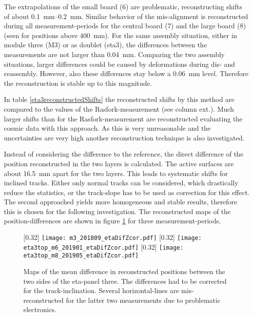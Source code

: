 \documentclass[
twoside,            %
BCOR1.4cm,          %
10pt,               %
headings=normal,    %
headsepline,        %
clearplainpage,		%
final,              %
div=14,
open=right,
bibliography=toc
]{scrreprt}
\begin{document}
The extrapolations of the small board (6) are problematic, reconstructing shifts of about \SIrange{0.1}{0.2}{mm}.
Similar behavior of the mis-alignment is reconstructed during all measurement-periods for the central board (7) and the large board (8) (seen for positions above \SI{400}{mm}).
For the same assembly situation, either in module three (M3) or as doublet (eta3), the differences between the measurements are not larger than \SI{0.04}{mm}.
Comparing the two assembly situations, larger differences could be caused by deformations during dis- and reassembly.
However, also these differences stay below a \SI{0.06}{mm} level.
Therefore the reconstruction is stable up to this magnitude.

In table \ref{eta3reconstructedShifts} the reconstructed shifts by this method are compared to the values of the Rasfork-measurement (see column ext.).
Much larger shifts than for the Rasfork-measurement are reconstructed evaluating the cosmic data with this approach.
As this is very unreasonable and the uncertainties are very high another reconstruction technique is also investigated.

Instead of considering the difference to the reference, the direct difference of the position reconstructed in the two layers is calculated.
The active surfaces are about \SI{16.5}{mm} apart for the two layers.
This leads to systematic shifts for inclined tracks.
Either only normal tracks can be considered, which drastically reduce the statistics, or the track-slope has to be used as correction for this effect.
The second approached yields more homogeneous and stable results, therefore this is chosen for the following investigation.
The reconstructed maps of the position-differences are shown in figure \ref{eta3CentroidDifference} for three measurement-periods.

\begin{figure}[!h]
	\centering
	[0.32\textwidth]
	{\texttt{[image: m3\_201809\_etaDifZcor.pdf]}}
	\hfill
	[0.32\textwidth]
	{\texttt{[image: eta3top\_m6\_201901\_etaDifZcor.pdf]}}
	\hfill
	[0.32\textwidth]
	{\texttt{[image: eta3top\_m8\_201905\_etaDifZcor.pdf]}}
	\vspace{-2mm}
	\caption{
		Maps of the mean difference in reconstructed positions between the two sides of the eta-panel three.
		The differences had to be corrected for the track-inclination.
		Several horizontal-lines are mis-reconstructed for the latter two measurements due to problematic electronics.
	}
	\label{eta3CentroidDifference}
\end{figure}
\end{document}
